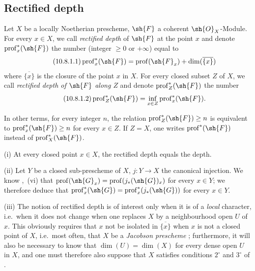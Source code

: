 \subsection{Rectified depth}
\label{subsection:IV.10.8}

\begin{definition}[10.8.1]
\label{IV.10.8.1}
Let $X$ be a locally Noetherian prescheme, $\sh{F}$ a coherent $\sh{O}_X$-Module.
For every $x\in X$, we call \emph{rectified depth} of $\sh{F}$ at the point $x$ and denote $\operatorname{prof}^*_x(\sh{F})$ the number (integer $\geq 0$ or $+\infty$) equal to
\begin{equation}
\label{IV.10.8.1.1}
\tag{10.8.1.1}
\operatorname{prof}^*_x(\sh{F})=\operatorname{prof}(\sh{F}_x)+\dim(\overline{\{x\}})
\end{equation}
where $\overline{\{x\}}$ is the closure of the point $x$ in $X$.
For every closed subset $Z$ of $X$, we call \emph{rectified depth of $\sh{F}$ along $Z$} and denote $\operatorname{prof}^*_Z(\sh{F})$ the number
\begin{equation}
\label{IV.10.8.1.2}
\tag{10.8.1.2}
\operatorname{prof}^*_Z(\sh{F})=\inf_{x\in Z}\operatorname{prof}^*_x(\sh{F}).
\end{equation}
\end{definition}

In other terms, for every integer $n$, the relation $\operatorname{prof}^*_Z(\sh{F})\geq n$ is equivalent to $\operatorname{prof}^*_x(\sh{F})\geq n$ for every $x\in Z$.
If $Z=X$, one writes $\operatorname{prof}^*(\sh{F})$ instead of $\operatorname{prof}^*_X(\sh{F})$.


\begin{remarks}[10.8.2]
\label{IV.10.8.2}
(i) At every closed point $x\in X$, the rectified depth equals the depth.

(ii) Let $Y$ be a closed sub-prescheme of $X$, $j:Y\to X$ the canonical injection.
We know ,~(vi) that $\operatorname{prof}(\sh{G}_x)=\operatorname{prof}(j_*(\sh{G})_x)$ for every $x\in Y$; we therefore deduce that $\operatorname{prof}^*_x(\sh{G})=\operatorname{prof}^*_x(j_*(\sh{G}))$ for every $x\in Y$.

(iii) The notion of rectified depth is of interest only when it is of a \emph{local} character, i.e.\ when it does not change when one replaces $X$ by a neighbourhood open $U$ of $x$.
This obviously requires that $x$ not be isolated in $\overline{\{x\}}$ when $x$ is not a closed point of $X$, i.e.\ most often, that $X$ be a \emph{Jacobson prescheme} ; furthermore, it will also be necessary to know that $\dim(U)=\dim(X)$ for every dense open $U$ in $X$, and one must therefore also suppose that $X$ satisfies conditions $2^\circ$ and $3^\circ$ of .
\end{remarks}


